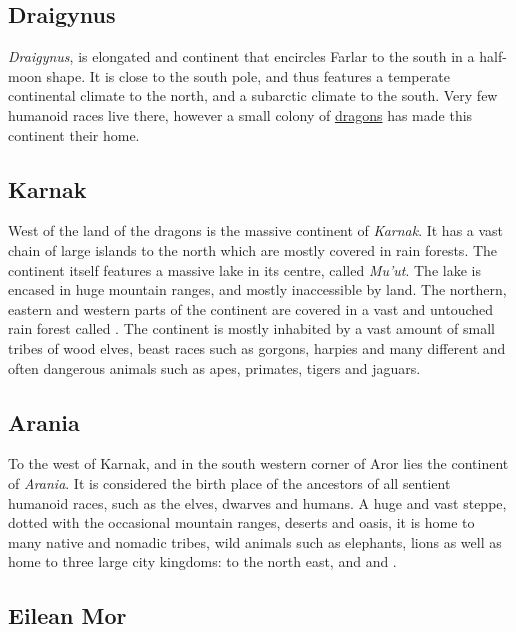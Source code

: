 \subsection{Draigynus}
\label{sec:Draigynus}

\emph{Draigynus}, is elongated and continent that encircles Farlar to the
south in a half-moon shape. It is close to the south pole, and thus features a
temperate continental climate to the north, and a subarctic climate to the
south. Very few humanoid races live there, however a small colony of
\hyperref[sec:Dragons]{dragons} has made this continent their home.

\subsection{Karnak}
\label{sec:Karnak}

West of the land of the dragons is the massive continent of \emph{Karnak}. It
has a vast chain of large islands to the north which are mostly covered in
rain forests. The continent itself features a massive lake in its centre,
called \emph{Mu'ut}. The lake is encased in huge mountain ranges, and mostly
inaccessible by land. The northern, eastern and western parts of the continent
are covered in a vast and untouched rain forest called .
The continent is mostly inhabited by a vast amount of small tribes of wood
elves, beast races such as gorgons, harpies and many different and often
dangerous animals such as apes, primates, tigers and jaguars.

\subsection{Arania}
\label{sec:Arania}

To the west of Karnak, and in the south western corner of Aror lies the
continent of \emph{Arania}. It is considered the birth place of the ancestors
of all sentient humanoid races, such as the elves, dwarves and humans. A huge
and vast steppe, dotted with the occasional mountain ranges, deserts and oasis,
it is home to many native and nomadic tribes, wild animals such as elephants,
lions as well as home to three large city kingdoms:  to the north east, and  and
.

\subsection{Eilean Mor}
\label{sec:Eilean Mor}

